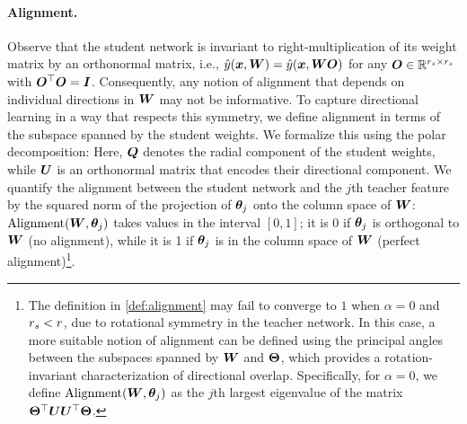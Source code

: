 \paragraph{Alignment.}
Observe that the student network is invariant to right-multiplication of its weight matrix by an orthonormal matrix, i.e., $\hat y(\boldsymbol{x}, \boldsymbol{W}) = \hat y(\boldsymbol{x}, \boldsymbol{W} \boldsymbol{O})$ for any $\boldsymbol{O} \in \mathbb{R}^{r_s \times r_s}$ with $\boldsymbol{O}^\top \boldsymbol{O} = \boldsymbol{I}$. Consequently, any notion of alignment that depends on individual directions in $\boldsymbol{W}$ may not be informative. To capture directional learning in a way that respects this symmetry, we define alignment in terms of the subspace spanned by the student weights. We formalize this using the polar decomposition:
Here, $\boldsymbol{Q}$ denotes the radial component of the student weights, while $\boldsymbol{U}$ is an orthonormal matrix that encodes their directional component. We quantify the alignment between the student network and the $j$th teacher feature by the squared norm of the projection of $\boldsymbol{\theta}_j$ onto the column space of $\boldsymbol{W}$:
$\mathrm{Alignment}(\boldsymbol{W}, \boldsymbol{\theta}_j)$ takes values in the interval $[0,1]$;
it is 0 if $\boldsymbol{\theta}_j$ is orthogonal to $\boldsymbol{W}$ (no alignment),
while it is 1 if $\boldsymbol{\theta}_j$ is in the column space of $\boldsymbol{W}$ (perfect alignment)\footnote{The definition in \eqref{def:alignment} may fail to converge to $1$ when $\alpha = 0$ and $r_s < r$, due to rotational symmetry in the teacher network. In this case, a more suitable notion of alignment can be defined using the principal angles between the subspaces spanned by $\boldsymbol{W}$ and $\boldsymbol{\Theta}$, which provides a rotation-invariant characterization of directional overlap. Specifically, for $\alpha = 0$, we define $\mathrm{Alignment}(\boldsymbol{W}, \boldsymbol{\theta}_j)$ as the $j$th largest eigenvalue of the matrix $\boldsymbol{\Theta}^\top \boldsymbol{U} \boldsymbol{U}^\top \boldsymbol{\Theta}$. \vspace{-3mm}}.  


